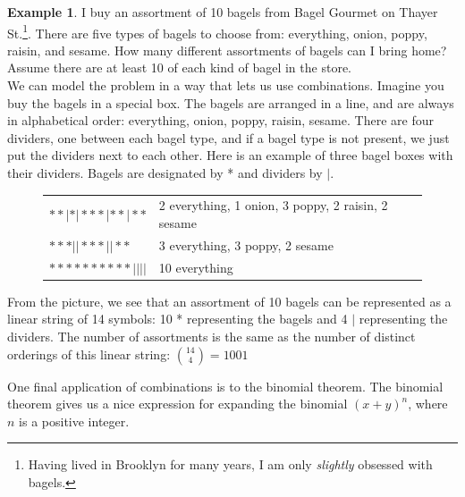 \documentclass[12pt]{article}
\theoremstyle{definition}
\newtheorem*{example}{Example}
\theoremstyle{remark}
\begin{document}
\begin{example}
I buy an assortment of 10 bagels from Bagel Gourmet on Thayer St.\footnote{Having lived in Brooklyn for many years, I am only \emph{slightly} obsessed with bagels.}. There are five types of bagels to choose from: everything, onion, poppy, raisin, and sesame. How many different assortments of bagels can I bring home? Assume there are at least 10 of each kind of bagel in the store.\\

We can model the problem in a way that lets us use combinations. Imagine you buy the bagels in a special box. The bagels are arranged in a line, and are always in alphabetical order: everything, onion, poppy, raisin, sesame. There are four dividers, one between each bagel type, and if a bagel type is not present, we just put the dividers next to each other. Here is an example of three bagel boxes with their dividers. Bagels are designated by * and dividers by $|$.
\begin{figure}[H]
\begin{tabular}{ll}
$* * | * | * * * | * * | * *$ & 2 everything, 1 onion, 3 poppy, 2 raisin, 2 sesame \\
$* * * | | * * * | | * *$ & 3 everything, 3 poppy, 2 sesame\\
$* * * * * * * * * * | | | |$ & 10 everything\\
\end{tabular}
\end{figure}
From the picture, we see that an assortment of 10 bagels can be represented as a linear string of 14 symbols: 10 * representing the bagels and 4 $|$ representing the dividers. The number of assortments is the same as the number of distinct orderings of this linear string: $\binom{14}{4} = 1001$
\end{example}


One final application of combinations is to the binomial theorem. The binomial theorem gives us a nice expression for expanding the binomial $(x+y)^n$, where $n$ is a positive integer.
\end{document}
